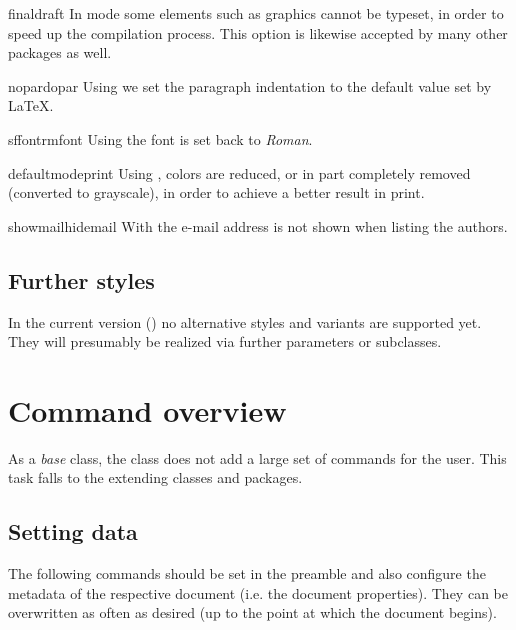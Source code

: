 \documentclass{sopra-base}
\begin{document}
    \begin{argument}{final}{draft}
        In  mode some elements such as graphics cannot be
        typeset, in order to speed up the compilation process.
        This option is likewise accepted by many other packages as well.
    \end{argument}

    \begin{argument}{nopar}{dopar}
        Using  we set the paragraph indentation
        to the default value set by \LaTeX.
    \end{argument}


    \begin{argument}{sffont}{rmfont}
        Using  the font is set back to \emph{Roman}.
    \end{argument}

    \begin{argument}{defaultmode}{print}
        Using , colors are reduced, or in part
        completely removed (converted to grayscale), in order to achieve
        a better result in print.
    \end{argument}

    \begin{argument}{showmail}{hidemail}
        With  the e-mail address is not shown when
        listing the authors.
    \end{argument}

    \subsection{Further styles}
    In the current version (\thesobversion) no alternative
    styles and variants are supported yet. They will presumably be realized
    via further parameters or subclasses.

\section{Command overview}

As a \emph{base} class, the class does not add a large set of commands for
the user. This task falls to the extending classes and packages.

\subsection{Setting data}
\label{sec:DatenSetzen}
The following commands should be set in the preamble and also configure
the metadata of the respective document (i.e. the document properties).
They can be overwritten as often as desired (up to the point at which
the document begins). 
\end{document}
